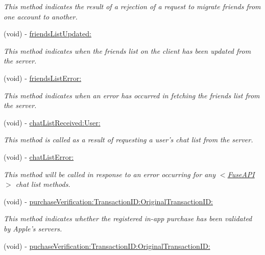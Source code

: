 \begin{DoxyCompactItemize}
\begin{DoxyCompactList}\small\item\em This method indicates the result of a rejection of a request to migrate friends from one account to another. \end{DoxyCompactList}\item 
(void) -\/ \hyperlink{protocol_fuse_delegate-p_a4b29ca96b491f3ac8548a85983aa0cff}{friends\+List\+Updated\+:}
\begin{DoxyCompactList}\small\item\em This method indicates when the friends list on the client has been updated from the server. \end{DoxyCompactList}\item 
(void) -\/ \hyperlink{protocol_fuse_delegate-p_ae3f6e6108bdf165e61c77bed22f10a1f}{friends\+List\+Error\+:}
\begin{DoxyCompactList}\small\item\em This method indicates when an error has occurred in fetching the friends list from the server. \end{DoxyCompactList}\item 
(void) -\/ \hyperlink{protocol_fuse_delegate-p_a49cea07cc02eebc3f99b8438abb0233f}{chat\+List\+Received\+:\+User\+:}
\begin{DoxyCompactList}\small\item\em This method is called as a result of requesting a user's chat list from the server. \end{DoxyCompactList}\item 
(void) -\/ \hyperlink{protocol_fuse_delegate-p_a645fcbccfd9d5555973f54752cfe83a0}{chat\+List\+Error\+:}
\begin{DoxyCompactList}\small\item\em This method will be called in response to an error occurring for any $<$\hyperlink{interface_fuse_a_p_i}{Fuse\+A\+P\+I}$>$ chat list methods. \end{DoxyCompactList}\item 
(void) -\/ \hyperlink{protocol_fuse_delegate-p_a74e3e8647db995888bdf94c64d5ad26b}{purchase\+Verification\+:\+Transaction\+I\+D\+:\+Original\+Transaction\+I\+D\+:}
\begin{DoxyCompactList}\small\item\em This method indicates whether the registered in-\/app purchase has been validated by Apple's servers. \end{DoxyCompactList}\item 
(void) -\/ \hyperlink{protocol_fuse_delegate-p_a588f6c19e418c6adbba67fd86c0b6515}{puchase\+Verification\+:\+Transaction\+I\+D\+:\+Original\+Transaction\+I\+D\+:}

\end{DoxyCompactItemize}
